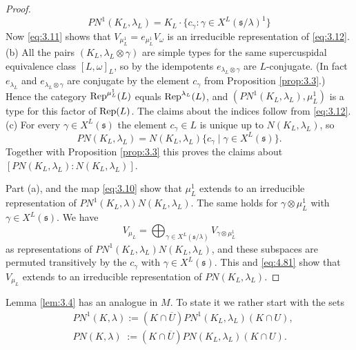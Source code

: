 \documentclass[11pt]{amsart}
\theoremstyle{definition}
\begin{document}
\begin{proof}
\begin{equation}\label{eq:3.12}
PN^1 (K_L,\lambda_L) = K_L \cdot \{ c_\gamma : \gamma \in X^L ({{\mathfrak s}} / \lambda)^1 \}
\end{equation}
Now \eqref{eq:3.11} shows that $V_{\mu_L^1} = e_{\mu_L^1} V_\omega$ 
is an irreducible representation of \eqref{eq:3.12}. \\
(b) All the pairs $(K_L,\lambda_L \otimes \gamma)$ are simple types for the same
supercuspidal equivalence class $[L,\omega]_L$, so by \cite[Corollary 7.3]{SeSt6}
the idempotents $e_{\lambda_L \otimes \gamma}$ are $L$-conjugate. (In fact 
$e_{\lambda_L}$ and $e_{\lambda_L \otimes \gamma}$ are conjugate by the element
$c_\gamma$ from Proposition \ref{prop:3.3}.)
Hence the category ${{\rm Rep}}^{\mu_L^1}(L)$ equals ${{\rm Rep}}^{\lambda_L}(L)$, and 
$(PN^1 (K_L,\lambda_L),\mu_L^1)$ is a type for this factor of ${{\rm Rep}} (L)$. 
The claims about the indices follow from \eqref{eq:3.12}. \\
(c) For every $\gamma \in X^L ({{\mathfrak s}})$ the element $c_\gamma \in L$ is 
unique up to $N(K_L,\lambda_L)$, so 
\begin{equation}\label{eq:4.81}
PN (K_L,\lambda_L) = N(K_L,\lambda_L) \{ c_\gamma \mid \gamma \in X^L ({{\mathfrak s}}) \} .
\end{equation}
Together with Proposition \ref{prop:3.3} this proves the claims about 
$[PN (K_L,\lambda_L) : N(K_L,\lambda_L)]$. 

Part (a), and the map \eqref{eq:3.10} show that $\mu_L^1$ extends to an 
irreducible representation of $PN^1 (K_L,\lambda) N(K_L,\lambda_L)$.
The same holds for $\gamma \otimes \mu_L^1$ with $\gamma \in X^L ({{\mathfrak s}})$. We have
\[
V_{\mu_L } = \bigoplus\nolimits_{\gamma \in X^L ({{\mathfrak s}} / \lambda)} 
V_{\gamma \otimes \mu_L^1}
\]
as representations of $PN^1 (K_L,\lambda_L) N(K_L,\lambda_L)$, and these subspaces 
are permuted transitively by the $c_\gamma$ with $\gamma \in X^L ({{\mathfrak s}})$. 
This and \eqref{eq:4.81} show that $V_{\mu_L }$ extends to an irreducible 
representation of $PN (K_L,\lambda_L)$.
\end{proof}

Lemma \ref{lem:3.4} has an analogue in $M$. 
To state it we rather start with the sets \label{i:40} \label{i:41}
\begin{equation}\label{eq:4.5}
\begin{aligned}
& PN^1 (K,\lambda) := (K \cap \overline{U}) PN^1 (K_L,\lambda_L) (K \cap U) , \\
& PN (K,\lambda) \; := (K \cap \overline{U}) PN (K_L,\lambda_L) (K \cap U) .
\end{aligned}
\end{equation}
\end{document}
